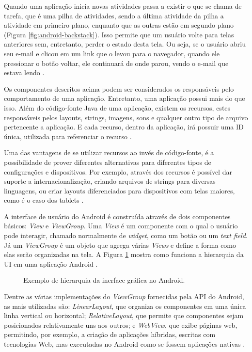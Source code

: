 \documentclass[diss]{template/setrem}
\begin{document}
Quando uma aplicação inicia novas atividades passa a existir o que se chama de tarefa, que é uma pilha de atividades, sendo a última atividade da pilha a atividade em primeiro plano, enquanto que as outras estão em segundo plano (Figura \ref{fig:android-backstack}). Isso permite que um usuário volte para telas anteriores sem, entretanto, perder o estado desta tela. Ou seja, se o usuário abriu seu e-mail e clicou em um link que o levou para o navegador, quando ele pressionar o botão voltar, ele continuará de onde parou, vendo o e-mail que estava lendo \citep{Android2012}.

Os componentes descritos acima podem ser considerados os responsáveis pelo comportamento de uma aplicação. Entretanto, uma aplicação possui mais do que isso. Além do código-fonte Java de uma aplicação, existem os recursos, estes responsáveis pelos layouts, strings, imagens, sons e qualquer outro tipo de arquivo pertencente a aplicação. E cada recurso, dentro da aplicação, irá possuir uma ID única, utilizada para referenciar o recurso \citep{Android2012}.

Uma das vantagens de se utilizar recursos ao invés de código-fonte, é a possibilidade de prover diferentes alternativas para diferentes tipos de configurações e dispositivos. Por exemplo, através dos recursos é possível dar suporte a internacionalização, criando arquivos de strings para diversas linguagens, ou criar layouts diferenciados para dispositivos com telas maiores, como é o caso dos tablets \citep{Android2012}.

A interface de usuário do Android é construída através de dois componentes básicos: \emph{View} e \emph{ViewGroup}. Uma \emph{View} é um componente com o qual o usuário pode interagir, chamado normalmente de \emph{widget}, como um botão ou um \emph{text field}. Já um \emph{ViewGroup} é um objeto que agrega várias \emph{Views} e define a forma como elas serão organizadas na tela. A Figura \ref{fig:android-viewgroup} mostra como funciona a hierarquia da UI em uma aplicação Android \citep{Android2012}.

\begin{figure}[!h]
    \caption{Exemplo de hierarquia da inerface gráfica no Android.}
    \label{fig:android-viewgroup}
\end{figure}

Dentre as várias implementações do \emph{ViewGroup} fornecidas pela API do Android, as mais utilizadas são: \emph{LinearLayout}, que organiza os componentes em uma única linha vertical ou horizontal; \emph{RelativeLayout}, que permite que componentes sejam posicionados relativamente uns aos outros; e \emph{WebView}, que exibe páginas web, permitindo, por exemplo, a criação de aplicações híbridas, escritas com tecnologias Web, mas executadas no Android como se fossem aplicações nativas \citep{Android2012}.
\end{document}
